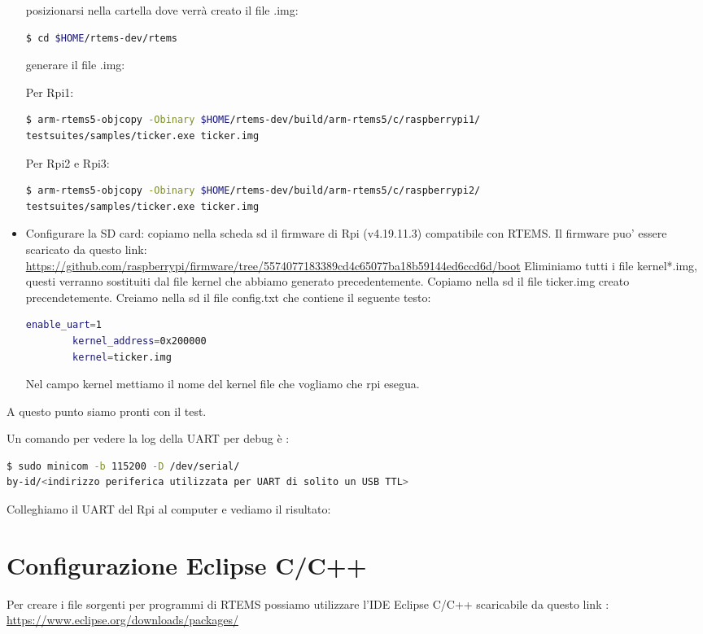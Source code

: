\documentclass[10pt, a4paper]{article}
\begin{document}
\begin{flushleft}
\begin{itemize}
posizionarsi nella cartella dove verrà creato il file .img:
\begin{lstlisting}[language=bash] 
$ cd $HOME/rtems-dev/rtems 
\end{lstlisting}		

generare il file .img:

Per Rpi1: 
\begin{lstlisting}[language=bash] 
$ arm-rtems5-objcopy -Obinary $HOME/rtems-dev/build/arm-rtems5/c/raspberrypi1/ 
testsuites/samples/ticker.exe ticker.img
\end{lstlisting}
Per Rpi2 e Rpi3: 
\begin{lstlisting}[language=bash ] 
$ arm-rtems5-objcopy -Obinary $HOME/rtems-dev/build/arm-rtems5/c/raspberrypi2/
testsuites/samples/ticker.exe ticker.img
\end{lstlisting}
\item Configurare la SD card:
copiamo nella scheda sd il firmware di Rpi (v4.19.11.3) compatibile con RTEMS. 
Il firmware puo' essere scaricato da questo link:  \\
\small\url{https://github.com/raspberrypi/firmware/tree/5574077183389cd4c65077ba18b59144ed6ccd6d/boot}
Eliminiamo tutti i file kernel*.img, questi verranno sostituiti dal file 
kernel che abbiamo generato precedentemente.
Copiamo nella sd il file ticker.img creato precendetemente.
Creiamo nella sd il file config.txt che contiene il seguente testo:
\begin{lstlisting}[language=bash ] 
		enable_uart=1
		kernel_address=0x200000
 		kernel=ticker.img 
\end{lstlisting}
Nel campo kernel mettiamo il nome del kernel file che vogliamo che rpi esegua.
\end{itemize}
	 	 
A questo punto siamo pronti con il test.

Un comando per vedere la log della UART per debug è :
\begin{lstlisting}[language=bash] 
$ sudo minicom -b 115200 -D /dev/serial/
by-id/<indirizzo periferica utilizzata per UART di solito un USB TTL>
\end{lstlisting}

Colleghiamo il UART del Rpi al computer e vediamo il risultato:

\newpage
\section{Configurazione Eclipse C/C++} 
Per creare i file sorgenti per programmi di RTEMS possiamo utilizzare l'IDE Eclipse C/C++ scaricabile da questo link :
\url{https://www.eclipse.org/downloads/packages/}



\end{flushleft}
\end{document}
